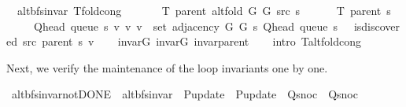 \begin{isabellebody}
\isamarkupfalse%
\ {\isacharparenleft}{\kern0pt}\ alt{\isacharunderscore}{\kern0pt}bfs{\isacharunderscore}{\kern0pt}invar{\isacharparenright}{\kern0pt}\ T{\isacharunderscore}{\kern0pt}fold{\isacharunderscore}{\kern0pt}cong{\isacharcolon}{\kern0pt}\isanewline
\ \ \isanewline
\ \ \ \ {\isachardoublequoteopen}T\ {\isacharparenleft}{\kern0pt}parent\ {\isacharparenleft}{\kern0pt}alt{\isacharunderscore}{\kern0pt}fold\ G{}\ G{}\ src\ s{\isacharparenright}{\kern0pt}{\isacharparenright}{\kern0pt}\ {\isacharequal}{\kern0pt}\isanewline
\ \ \ \ \ T\ {\isacharparenleft}{\kern0pt}parent\ s{\isacharparenright}{\kern0pt}\ {\isasymunion}\isanewline
\ \ \ \ \ {\isacharbraceleft}{\kern0pt}{\isacharparenleft}{\kern0pt}Q{\isacharunderscore}{\kern0pt}head\ {\isacharparenleft}{\kern0pt}queue\ s{\isacharparenright}{\kern0pt}{\isacharcomma}{\kern0pt}\ v{\isacharparenright}{\kern0pt}\ {\isacharbar}{\kern0pt}v{\isachardot}{\kern0pt}\ v\ {\isasymin}\ set\ {\isacharparenleft}{\kern0pt}adjacency\ G{}\ G{}\ s\ {\isacharparenleft}{\kern0pt}Q{\isacharunderscore}{\kern0pt}head\ {\isacharparenleft}{\kern0pt}queue\ s{\isacharparenright}{\kern0pt}{\isacharparenright}{\kern0pt}{\isacharparenright}{\kern0pt}\ {\isasymand}\ {\isasymnot}\ is{\isacharunderscore}{\kern0pt}discovered\ src\ {\isacharparenleft}{\kern0pt}parent\ s{\isacharparenright}{\kern0pt}\ v{\isacharbraceright}{\kern0pt}{\isachardoublequoteclose}\isanewline
%
\isadelimproof
\ \ %
\endisadelimproof
%
\isatagproof
{}\isamarkupfalse%
\ invar{\isacharunderscore}{\kern0pt}G{}\ invar{\isacharunderscore}{\kern0pt}G{}\ invar{\isacharunderscore}{\kern0pt}parent\isanewline
\ \ \isamarkupfalse%
\ {\isacharparenleft}{\kern0pt}intro\ T{\isacharunderscore}{\kern0pt}alt{\isacharunderscore}{\kern0pt}fold{\isacharunderscore}{\kern0pt}cong{\isacharparenright}{\kern0pt}%
\endisatagproof
{\isafoldproof}%
%
\isadelimproof
%
\endisadelimproof
%
\begin{isamarkuptext}%
Next, we verify the maintenance of the loop invariants one by one.%
\end{isamarkuptext}\isamarkuptrue%
\isamarkupfalse%
\ alt{\isacharunderscore}{\kern0pt}bfs{\isacharunderscore}{\kern0pt}invar{\isacharunderscore}{\kern0pt}not{\isacharunderscore}{\kern0pt}DONE\ {\isacharequal}{\kern0pt}\ alt{\isacharunderscore}{\kern0pt}bfs{\isacharunderscore}{\kern0pt}invar\ \ P{\isacharunderscore}{\kern0pt}update\ {\isacharequal}{\kern0pt}\ P{\isacharunderscore}{\kern0pt}update\ \ Q{\isacharunderscore}{\kern0pt}snoc\ {\isacharequal}{\kern0pt}\ Q{\isacharunderscore}{\kern0pt}snoc\ \isanewline

\end{isabellebody}
